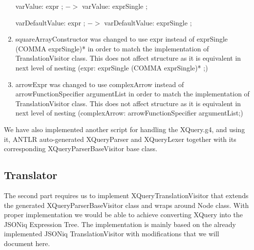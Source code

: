 \begin{enumerate}
	varValue: expr ; $->$ varValue: exprSingle ;
	
	varDefaultValue: expr ; $->$ varDefaultValue: exprSingle ;
	
	\item squareArrayConstructor was changed to use expr instead of exprSingle (COMMA exprSingle)* in order to match the implementation of TranslationVisitor class. This does not affect structure as it is equivalent in next level of nesting (expr: exprSingle (COMMA exprSingle)* ;)
	
	\item arrowExpr was changed to use complexArrow instead of arrowFunctionSpecifier argumentList in order to match the implementation of TranslationVisitor class. This does not affect structure as it is equivalent in next level of nesting (complexArrow: arrowFunctionSpecifier argumentList;)
\end{enumerate}

We have also implemented another script for handling the XQuery.g4, and using it, ANTLR auto-generated XQueryParser and XQueryLexer together with its corresponding XQueryParserBaseVisitor base class.

\subsection{Translator}
The second part requires us to implement XQueryTranslationVisitor that extends the generated XQueryParserBaseVisitor class and wraps around Node class. With proper implementation we would be able to achieve converting XQuery into the JSONiq Expression Tree. The implementation is mainly based on the already implemented JSONiq TranslationVisitor with modifications that we will document here.

